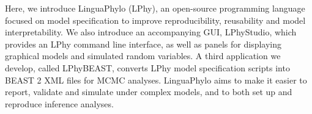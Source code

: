 \documentclass[10pt,letterpaper,table]{article}
\begin{document}
Here, we introduce LinguaPhylo (LPhy), an open-source programming
language focused on model specification to improve reproducibility, reusability and model interpretability. 
We also introduce an accompanying GUI, LPhyStudio, which provides an
LPhy command line interface, as well as panels for displaying graphical models
and simulated random variables.
A third application we develop, called LPhyBEAST, converts LPhy model specification scripts into BEAST 2 XML files for MCMC analyses.
LinguaPhylo aims to make it easier to report,
validate and simulate under complex models, and to both set up and
reproduce inference analyses.




\end{document}
